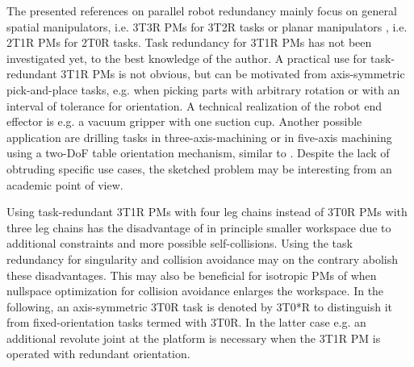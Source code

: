 \documentclass[
	graybox,
	vecphys] %
	{svmult}
\begin{document}




The presented references on parallel robot redundancy mainly focus on general spatial manipulators, i.e. 3T3R PMs for 3T2R tasks \cite{MerletPerDan2000,OenWan2007,CorinaldiAngCal2016,SchapplerTapOrt2019} or planar manipulators \cite{AgarwalNasBan2016}, i.e. 2T1R PMs for 2T0R tasks.
Task redundancy for 3T1R PMs %
has not been investigated yet, to the best knowledge of the author.
A practical use for task-redundant 3T1R PMs is not obvious, but can be motivated from axis-symmetric pick-and-place tasks, e.g. when picking parts with arbitrary rotation or with an interval of tolerance for orientation.
A technical realization of the robot end effector is e.g. a vacuum gripper with one suction cup.
Another possible application are drilling tasks in three-axis-machining or in five-axis machining using a two-DoF table orientation mechanism, similar to \cite{CorinaldiAngCal2016}.
Despite the lack of obtruding specific use cases, the sketched problem may be interesting from an academic point of view. %

Using task-redundant 3T1R PMs with four leg chains instead of 3T0R PMs with three leg chains has the disadvantage of in principle smaller workspace due to additional constraints and more possible self-collisions.
Using the task redundancy for singularity and collision avoidance may on the contrary abolish these disadvantages.
This may also be beneficial for isotropic PMs of \cite{Carricato2005,Gogu2008} when nullspace optimization for collision avoidance enlarges the workspace.
In the following, an axis-symmetric 3T0R task is denoted by 3T0*R to distinguish it from fixed-orientation tasks termed with 3T0R.
In the latter case e.g. an additional revolute joint at the platform is necessary when the 3T1R PM is operated with redundant orientation.
\end{document}
